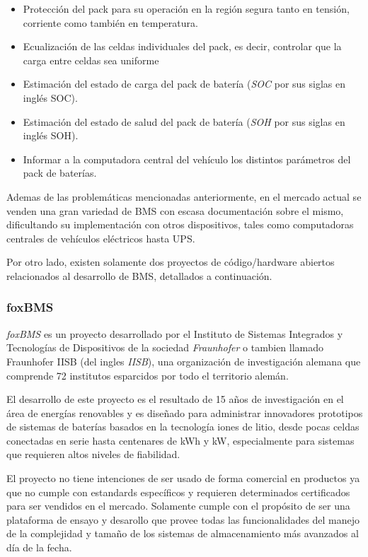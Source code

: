 \documentclass[10pt,a4paper]{article}
\begin{document}
\begin{itemize}
    \item Protección del pack para su operación en la región segura tanto 
        en tensión, corriente como también en temperatura.
    \item Ecualización de las celdas individuales del pack, es decir,
        controlar que la carga entre celdas sea uniforme
    \item Estimación del estado de carga del pack de batería 
        (\emph{\acrshort{SOC}} por sus siglas en ingl\'es \acrlong{SOC}).
    \item Estimación del estado de salud del pack de batería 
        (\emph{\acrshort{SOH}} por sus siglas en ingl\'es \acrlong{SOH}).
    \item Informar a la computadora central del vehículo los distintos 
        parámetros del pack de baterías.
\end{itemize}

\noindent Ademas de las problem\'aticas mencionadas anteriormente, en el mercado
actual se venden una gran variedad de \acrshort{BMS} con escasa documentaci\'on
sobre el mismo, dificultando su implementaci\'on con otros dispositivos, tales 
como computadoras centrales de veh\'iculos el\'ectricos hasta \acrshort{UPS}.

Por otro lado, existen solamente dos proyectos de c\'odigo/hardware abiertos
relacionados al desarrollo de \acrshort{BMS}, detallados a continuaci\'on.

\subsubsection{foxBMS}

\emph{foxBMS} \cite{foxbms} es un proyecto desarrollado por el Instituto de Sistemas
Integrados y Tecnolog\'ias de Dispositivos de la sociedad \emph{Fraunhofer} o
tambien llamado Fraunhofer IISB (del ingles \emph{\acrlong{IISB}}), una
organización de investigación alemana que comprende 72 institutos esparcidos por
todo el territorio alem\'an.

\noindent El desarrollo de este proyecto es el resultado de 15 años de
investigaci\'on en el \'area de energ\'ias renovables y es diseñado para 
administrar innovadores prototipos de sistemas de bater\'ias basados en la 
tecnolog\'ia iones de litio, desde pocas celdas conectadas en serie hasta 
centenares de kWh y kW, especialmente para sistemas que requieren altos niveles 
de fiabilidad.

\noindent El proyecto no tiene intenciones de ser usado de forma comercial en
productos ya que no cumple con estandards espec\'ificos y requieren determinados
certificados para ser vendidos en el mercado. Solamente cumple con el 
prop\'osito de ser una plataforma de ensayo y desarollo que provee todas las 
funcionalidades del manejo de la complejidad y tamaño de los sistemas de 
almacenamiento más avanzados al d\'ia de la fecha.
\end{document}
